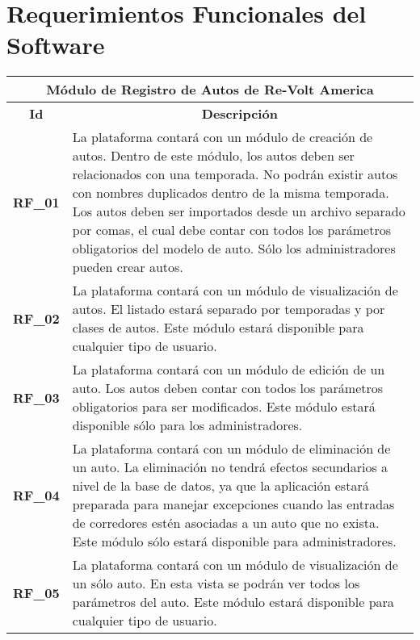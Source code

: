 \section{Requerimientos Funcionales del Software}
\begin{center}
	\begin{tabular}{ | l | p{15cm} |}
		\hline
		\multicolumn{2}{|c|}{\textbf{Módulo de Registro de Autos de Re-Volt America}} \\
		\hline
		\multicolumn{1}{|c|}{\textbf{Id}} & \multicolumn{1}{|c|}{\textbf{Descripción}} \\
		\hline
		{\textbf{RF\_01}} & La plataforma contará con un módulo de creación de autos. Dentro de este módulo, los autos deben ser relacionados con una temporada. No podrán existir autos con nombres duplicados dentro de la misma temporada. Los autos deben ser importados desde un archivo separado por comas, el cual debe contar con todos los parámetros obligatorios del modelo de auto. Sólo los administradores pueden crear autos. \\ \hline

		{\textbf{RF\_02}} & La plataforma contará con un módulo de visualización de autos. El listado estará separado por temporadas y por clases de autos. Este módulo estará disponible para cualquier tipo de usuario. \\ \hline

		{\textbf{RF\_03}} & La plataforma contará con un módulo de edición de un auto. Los autos deben contar con todos los parámetros obligatorios para ser modificados. Este módulo estará disponible sólo para los administradores. \\ \hline
		
		{\textbf{RF\_04}} & La plataforma contará con un módulo de eliminación de un auto. La eliminación no tendrá efectos secundarios a nivel de la base de datos, ya que la aplicación estará preparada para manejar excepciones cuando las entradas de corredores estén asociadas a un auto que no exista. Este módulo sólo estará disponible para administradores. \\ \hline
		
		{\textbf{RF\_05}} & La plataforma contará con un módulo de visualización de un sólo auto. En esta vista se podrán ver todos los parámetros del auto. Este módulo estará disponible para cualquier tipo de usuario. \\ \hline
	\end{tabular}
  
  \label{table:rf:cars}
\end{center}

